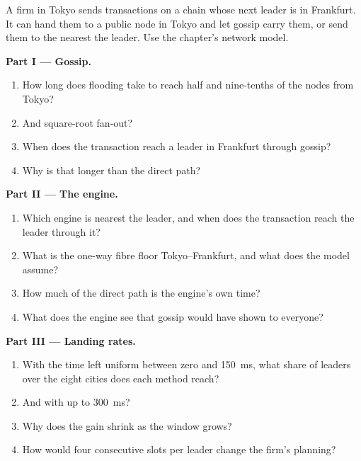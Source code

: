 \begin{problem}\label{pb:nw:on-chain-connectivity:1}
A firm in Tokyo sends transactions on a chain whose next leader is in Frankfurt. It can hand them to a public node in Tokyo and let gossip carry them,
or send them to the  nearest the leader. Use the chapter's network model.

\medskip\noindent\textbf{Part I --- Gossip.}
\begin{enumerate}
\item How long does flooding take to reach half and nine-tenths of the nodes from Tokyo?
\item And square-root fan-out?
\item When does the transaction reach a leader in Frankfurt through gossip?
\item Why is that longer than the direct path?
\end{enumerate}

\medskip\noindent\textbf{Part II --- The engine.}
\begin{enumerate}[resume]
\item Which engine is nearest the leader, and when does the transaction reach the leader through it?
\item What is the one-way fibre floor Tokyo--Frankfurt, and what  does the model assume?
\item How much of the direct path is the engine's own time?
\item What does the engine see that gossip would have shown to everyone?
\end{enumerate}

\medskip\noindent\textbf{Part III --- Landing rates.}
\begin{enumerate}[resume]
\item With the time left uniform between zero and \qty{150}{\milli\second}, what share of leaders over the eight cities does each method reach?
\item And with up to \qty{300}{\milli\second}?
\item Why does the gain shrink as the window grows?
\item How would four consecutive slots per leader change the firm's planning?
\end{enumerate}


\end{problem}
